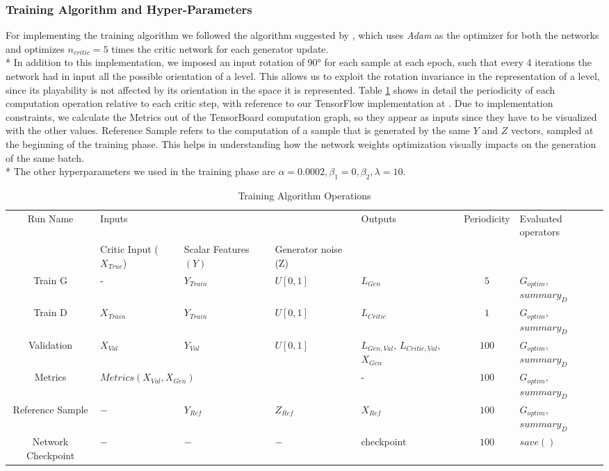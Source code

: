 \subsubsection{Training Algorithm and Hyper-Parameters}
For implementing the training algorithm we followed the algorithm suggested by \cite[alg.~1. p.~4]{wgangp}, which uses \textit{Adam}\cite{adam} as the optimizer for both the networks and optimizes $n_{critic} = 5$ times the critic network for each generator update. \\*
In addition to this implementation, we imposed an input rotation of 90° for each sample at each epoch, such that every 4 iterations the network had in input all the possible orientation of a level. This allows us to exploit the rotation invariance in the representation of a level, since its playability is not affected by its orientation in the space it is represented. Table \ref{tab:training} shows in detail the periodicity of each computation operation relative to each critic step, with reference to our TensorFlow implementation at \cite{gitrepo}. Due to implementation constraints, we calculate the Metrics out of the TensorBoard computation graph, so they appear as inputs since they have to be visualized with the other values. Reference Sample refers to the computation of a sample that is generated by the same $Y$ and $Z$ vectors, sampled at the beginning of the training phase. This helps in understanding how the network weights optimization visually impacts on the generation of the same batch. \\*
The other hyperparameters we used in the training phase are $\alpha=0.0002, \beta_1=0, \beta_2, \lambda=10$.

\begin{table}[h!]
	\centering
	\begin{tabularx}{\textwidth}{| c | X | X | X | X | c | X | }
		\hline
		Run Name & \multicolumn{3}{X|}{Inputs} & Outputs & Periodicity & Evaluated operators \\ \cline{2-4}
		& Critic Input ($X_{True}$) & Scalar Features $(Y)$ & Generator noise (Z) &   &   &   \\
		\hline
		Train G & - & $Y_{Train}$ & $U[0,1]$ & $L_{Gen}$ & $5$ & $G_{optim}$, $summary_D$ \\ \hline
		Train D & $X_{Train}$ & $Y_{Train}$ & $U[0,1]$ & $L_{Critic}$ & $1$ & $G_{optim}$, $summary_D$\\ \hline
		Validation & $X_{Val}$ & $Y_{Val}$ & $U[0,1]$ &  $L_{Gen, Val}$, $L_{Critic, Val}$, $X_{Gen}$ & $100$ & $G_{optim}$, $summary_D$ \\ \hline
		Metrics & \multicolumn{3}{X|}{$Metrics(X_{Val}, X_{Gen})$} &  - & $100$ & $G_{optim}$, $summary_D$ \\ \hline
		Reference Sample & $-$ & $Y_{Ref}$ & $Z_{Ref}$ &  $X_{Ref}$ & $100$ & $G_{optim}$, $summary_D$ \\ \hline
		Network Checkpoint & $-$ & $-$ & $-$  & checkpoint & $100$ & $save()$ \\ \hline
	\end{tabularx}
	\caption{Training Algorithm Operations}
	\label{tab:training}
\end{table}


